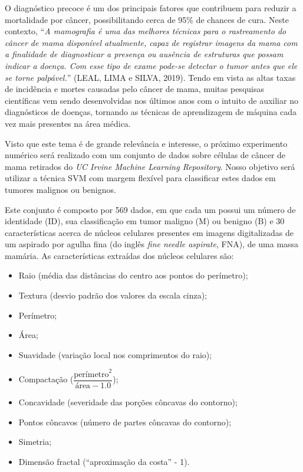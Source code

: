 \documentclass[12pt,a4paper]{scrartcl}
\theoremstyle{definition}%
\begin{document}
O diagnóstico precoce é um dos principais fatores que contribuem para
reduzir a mortalidade por câncer, possibilitando cerca de 95\% de
chances de cura. Neste contexto, ``\emph{A mamografia é uma das melhores
técnicas para o rastreamento do câncer de mama disponível atualmente,
capaz de registrar imagens da mama com a finalidade de diagnosticar a
presença ou ausência de estruturas que possam indicar a doença. Com esse
tipo de exame pode-se detectar o tumor antes que ele se torne
palpável.}'' (LEAL, LIMA e SILVA, 2019). Tendo em vista as altas taxas
de incidência e mortes causadas pelo câncer de mama, muitas pesquisas
científicas vem sendo desenvolvidas nos últimos anos com o intuito de
auxiliar no diagnósticos de doenças, tornando as técnicas de
aprendizagem de máquina cada vez mais presentes na área médica.

Visto que este tema é de grande relevância e interesse, o próximo
experimento numérico será realizado com um conjunto de dados sobre
células de câncer de mama retirados do \emph{UC Irvine Machine Learning
Repository}. Nosso objetivo será utilizar a técnica SVM com margem
flexível para classificar estes dados em tumores malignos ou benignos.

Este conjunto é composto por 569 dados, em que cada um possui um número
de identidade (ID), sua classificação em tumor maligno (M) ou benigno
(B) e 30 características acerca de núcleos celulares presentes em
imagens digitalizadas de um aspirado por agulha fina (do inglês
\emph{fine needle aspirate}, FNA), de uma massa mamária. As
características extraídas dos núcleos celulares são:

\begin{itemize}
\item
  Raio (média das distâncias do centro aos pontos do perímetro);
\item
  Textura (desvio padrão dos valores da escala cinza);
\item
  Perímetro;
\item
  Área;
\item
  Suavidade (variação local nos comprimentos do raio);
\item
  Compactação (\(\dfrac{\text{perímetro}^{2}}{\text{área} - 1.0}\));
\item
  Concavidade (severidade das porções côncavas do contorno);
\item
  Pontos côncavos (número de partes côncavas do contorno);
\item
  Simetria;
\item
  Dimensão fractal (``aproximação da costa'' - 1).
\end{itemize}
\end{document}
